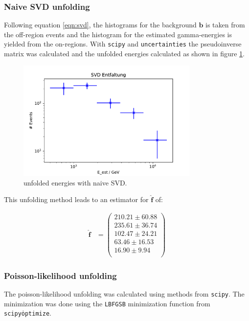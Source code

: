 \subsubsection{Naive SVD unfolding}
Following equation \eqref{eqn:svd}, the histograms for the background $\symbf{b}$ is taken from the off-region events
and the histogram for the estimated gamma-energies is yielded from the on-regions.
With \texttt{scipy} and \texttt{uncertainties} the pseudoinverse matrix was calculated and the unfolded energies calculated as shown in figure \ref{fig:svdUnfold}.

\begin{figure}[H]
  \centering
  \includegraphics[width=0.8\textwidth]{plots/NSVD.pdf}
  \caption{unfolded energies with naive SVD.}
  \label{fig:svdUnfold}
\end{figure}

This unfolding method leads to an estimator for $\hat{\symbf{f}}$ of:

\begin{align}
\hat{\symbf{f}} &=
\begin{pmatrix}
     210.21 \pm 60.88 \\
     235.61 \pm 36.74 \\
     102.47 \pm 24.21 \\
     63.46 \pm 16.53 \\
     16.90 \pm 9.94 \\
\end{pmatrix}
\end{align}


\subsubsection{Poisson-likelihood unfolding}
The poisson-likelihood unfolding was calculated using methods from \texttt{scipy}.
The minimization was done using the \texttt{L\-BFGS\-B} minimization
function from \texttt{scipy\.optimize}.

